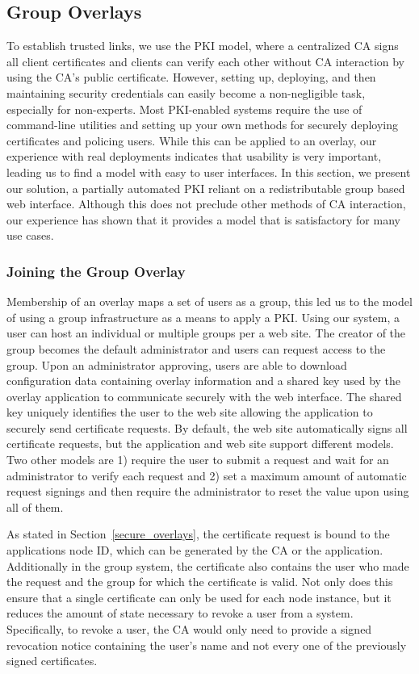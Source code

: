 \documentclass[conference]{IEEEtran}
\begin{document}
\subsection{Group Overlays}
\label{group_overlays}
To establish trusted links, we use the PKI model, where a centralized CA signs
all client certificates and clients can verify each other without CA interaction
by using the CA's public certificate.  However, setting up, deploying, and then
maintaining security credentials can easily become a non-negligible task,
especially for non-experts.  Most PKI-enabled systems require the use of
command-line utilities and setting up your own methods for securely
deploying certificates and policing users.  While this can be applied to an
overlay, our experience with real deployments indicates that usability is very
important, leading us to find a model with easy to user interfaces.
In this section, we present our solution, a partially automated PKI reliant on
a redistributable group based web interface.  Although this does not preclude
other methods of CA interaction, our experience has shown that it provides a
model that is satisfactory for many use cases.

\subsubsection{Joining the Group Overlay}
Membership of an overlay maps a set of users as a group, this led us to the
model of using a group infrastructure as a means to apply a PKI.  Using our
system, a user can host an individual or multiple groups per a web site.  The
creator of the group becomes the default administrator and users can request
access to the group.  Upon an administrator approving, users are able to
download configuration data containing overlay information and a shared key
used by the overlay application to communicate securely with the web interface.
The shared key uniquely identifies the user to the web site allowing the
application to securely send certificate requests.  By default, the web site
automatically signs all certificate requests, but the application and web site
support different models.  Two other models are 1) require the user to
submit a request and wait for an administrator to verify each request and 2)
set a maximum amount of automatic request signings and then require the 
administrator to reset the value upon using all of them.

As stated in Section~\ref{secure_overlays}, the certificate request is bound
to the applications node ID, which can be generated by the CA or the
application.  Additionally in the group system, the certificate also contains
the user who made the request and the group for which the certificate is valid.
Not only does this ensure that a single certificate can only be used for each
node instance, but it reduces the amount of state necessary to revoke a user
from a system.  Specifically, to revoke a user, the CA would only need to
provide a signed revocation notice containing the user's name and not every one
of the previously signed certificates.
\end{document}
